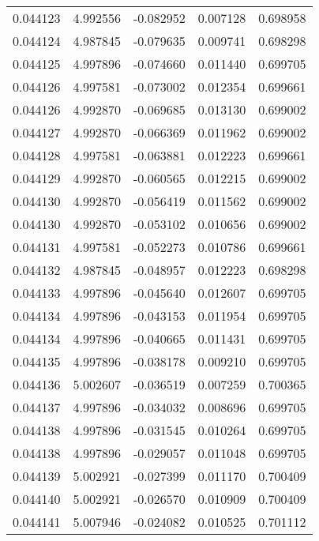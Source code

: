 \begin{tabular}{lrrrr}
0.044123    &  4.992556 & -0.082952 &  0.007128 &             0.698958 \\
0.044124    &  4.987845 & -0.079635 &  0.009741 &             0.698298 \\
0.044125    &  4.997896 & -0.074660 &  0.011440 &             0.699705 \\
0.044126    &  4.997581 & -0.073002 &  0.012354 &             0.699661 \\
0.044126    &  4.992870 & -0.069685 &  0.013130 &             0.699002 \\
0.044127    &  4.992870 & -0.066369 &  0.011962 &             0.699002 \\
0.044128    &  4.997581 & -0.063881 &  0.012223 &             0.699661 \\
0.044129    &  4.992870 & -0.060565 &  0.012215 &             0.699002 \\
0.044130    &  4.992870 & -0.056419 &  0.011562 &             0.699002 \\
0.044130    &  4.992870 & -0.053102 &  0.010656 &             0.699002 \\
0.044131    &  4.997581 & -0.052273 &  0.010786 &             0.699661 \\
0.044132    &  4.987845 & -0.048957 &  0.012223 &             0.698298 \\
0.044133    &  4.997896 & -0.045640 &  0.012607 &             0.699705 \\
0.044134    &  4.997896 & -0.043153 &  0.011954 &             0.699705 \\
0.044134    &  4.997896 & -0.040665 &  0.011431 &             0.699705 \\
0.044135    &  4.997896 & -0.038178 &  0.009210 &             0.699705 \\
0.044136    &  5.002607 & -0.036519 &  0.007259 &             0.700365 \\
0.044137    &  4.997896 & -0.034032 &  0.008696 &             0.699705 \\
0.044138    &  4.997896 & -0.031545 &  0.010264 &             0.699705 \\
0.044138    &  4.997896 & -0.029057 &  0.011048 &             0.699705 \\
0.044139    &  5.002921 & -0.027399 &  0.011170 &             0.700409 \\
0.044140    &  5.002921 & -0.026570 &  0.010909 &             0.700409 \\
0.044141    &  5.007946 & -0.024082 &  0.010525 &             0.701112 \\

\end{tabular}
